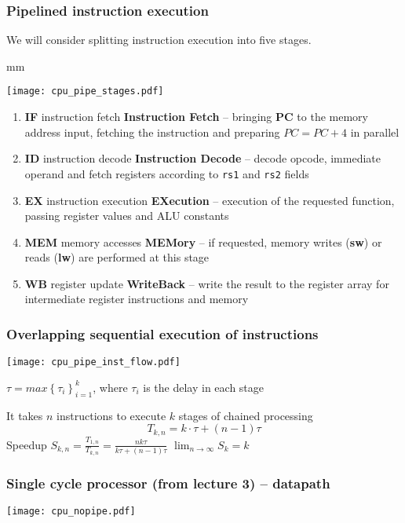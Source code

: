 \documentclass{beamer}
\begin{document}
\begin{frame}
\frametitle{Pipelined instruction execution}

We will consider splitting instruction execution into five stages.

 mm

{
\centering
\texttt{[image: cpu\_pipe\_stages.pdf]}
}

\begin{enumerate}
 \item \textbf{IF} instruction fetch \textbf{Instruction Fetch} -- bringing \textbf{PC} to the memory address input, fetching the instruction and preparing $PC = PC + 4$ in parallel
 \item \textbf{ID} instruction decode \textbf{Instruction Decode} -- decode opcode, immediate operand and fetch registers according to \texttt{rs1} and \texttt{rs2} fields
 \item \textbf{EX} instruction execution \textbf{EXecution} -- execution of the requested function, passing register values and ALU constants
 \item \textbf{MEM} memory accesses \textbf{MEMory} -- if requested, memory writes (\textbf{sw}) or reads (\textbf{lw}) are performed at this stage
 \item \textbf{WB} register update \textbf{WriteBack} -- write the result to the register array for intermediate register instructions and memory
\end{enumerate}

\end{frame}

\begin{frame}
\frametitle{Overlapping sequential execution of instructions}
\texttt{[image: cpu\_pipe\_inst\_flow.pdf]}

$\tau = max{\left\lbrace \tau_i \right\rbrace}^k_{i=1}$, where $\tau_i$ is the delay in each stage

It takes $n$ instructions to execute $k$ stages of chained processing
$$T_{k,n} = k \cdot \tau + (n - 1) \tau$$
Speedup
\hskip 7mm
$S_{k,n} = \frac{T_{1,n}}{T_{k,n}} = \frac{n k \tau}{k \tau + (n - 1) \tau}$
\hskip 7mm
$\lim_{n \rightarrow \infty} S_k = k$

\end{frame}

\begin{frame}
\frametitle{Single cycle processor (from lecture 3) -- datapath}
\texttt{[image: cpu\_nopipe.pdf]}
\end{frame}
\end{document}
